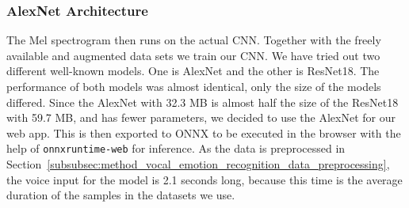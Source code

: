 \subsubsection{AlexNet Architecture}
\label{subsubsec:method_vocal_emotion_recognition_alexnet_architecture}
The Mel spectrogram then runs on the actual CNN. Together with the freely available and augmented data sets we train our CNN. We have tried out two different well-known models. One is AlexNet and the other is ResNet18. The performance of both models was almost identical, only the size of the models differed. Since the AlexNet with 32.3 MB is almost half the size of the ResNet18 with 59.7 MB, and has fewer parameters, we decided to use the AlexNet for our web app. This is then exported to ONNX to be executed in the browser with the help of \texttt{onnxruntime-web} for inference. As the data is preprocessed in Section~\ref{subsubsec:method_vocal_emotion_recognition_data_preprocessing}, the voice input for the model is 2.1 seconds long, because this time is the average duration of the samples in the datasets we use.
